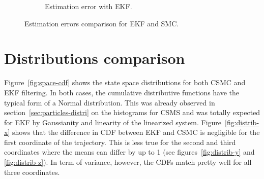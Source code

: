 \documentclass[english, DIV=13]{scrartcl}
\begin{document}
\begin{figure}
\begin{subfigure}{0.49\textwidth}
        \caption{Estimation error with EKF.} 
    \end{subfigure}
    \caption{Estimation errors comparison for EKF and SMC.}
    \label{fig:ekf-results}
\end{figure}

\section{Distributions comparison}
Figure~\ref{fig:space-cdf} shows the state space distributions for both CSMC and EKF
filtering. In both cases, the cumulative distributive functions have the
typical form of a Normal distribution. This was already observed in
section~\ref{sec:particles-distri} on the histograms for CSMS and was totally expected
for EKF by Gaussianity and linearity of the linearized system. 
Figure~\ref{fig:distrib-x} shows that the difference in CDF between EKF and CSMC is
negligible for the first coordinate of the trajectory. This is less true for the
second and third coordinates where the means can differ by up to 1 (see
figures~\ref{fig:distrib-y} and \ref{fig:distrib-z}). In term of variance, however,
the CDFs match pretty well for all three coordinates.
\end{document}
